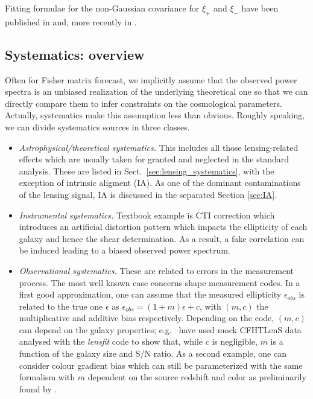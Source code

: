 Fitting formulae for the non-Gaussian covariance for $\xi_+$ and $\xi_-$ have been published in
\cite{2007MNRAS.375L...6S} and, more recently in \cite{2011ApJ...734...76S}.



\subsection{Systematics: overview}
\label{sec:WL_systematics}

Often for Fisher matrix forecast, we implicitly assume that the observed power spectra
is an unbiased realization of the underlying theoretical one so that we can
directly compare them to infer constraints on the cosmological parameters.
Actually, systematics make this assumption less than obvious. Roughly speaking,
we can divide systematics sources in three classes.

\begin{itemize}

\item{\it Astrophysical/theoretical systematics.} This includes all those
lensing-related effects which are usually taken for granted and neglected in the standard
analysis. These are listed in Sect.~\ref{sec:lensing_systematics}, with the exception
of intrinsic aligment (IA). As one of the dominant contaminations of the lensing signal,
IA is discussed in the separated Section \ref{sec:IA}.

\item{{\it Instrumental systematics.} Textbook example is CTI correction which
introduces an artificial distortion pattern which impacts the ellipticity of
each galaxy and hence the shear determination. As a result, a fake correlation
can be induced leading to a biased observed power spectrum.} \\

\item{{\it Observational systematics.} These are related to errors in the
measurement process. The most well known case concerns shape measurement codes.
In a first good approximation, one can assume that the measured ellipticity
$\epsilon_{obs}$ is related to the true one $\epsilon$ as $\epsilon_{obs} = (1
+ m) \epsilon + c$, with $(m, c)$ the multiplicative and additive bias
respectively. Depending on the code, $(m, c)$ can depend on the galaxy
properties; e.g.~\cite{CFHTLenS-shapes} have used mock CFHTLenS data analysed
with the {\it lensfit} code to show that, while $c$ is negligible, $m$ is a
function of the galaxy size and S/N ratio. As a second example, one can
consider colour gradient bias which can still be parameterized with the same
formalism with $m$ dependent on the source redshift and color as preliminarily
found by \cite{2013MNRAS.432.2385S}.}

\end{itemize}


